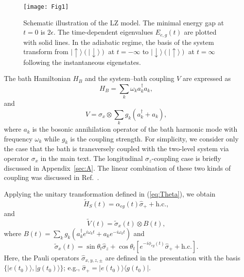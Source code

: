 \documentclass[english,nofootinbib, pra, twocolumn,superscriptaddress]{revtex4-1}
\begin{document}
\begin{figure}
\texttt{[image: Fig1]}\caption{Schematic illustration of the LZ model. The minimal energy gap at
$t=0$ is $2\epsilon$. The time-dependent eigenvalues $E_{e,g}(t)$
are plotted with solid lines. In the adiabatic regime, the basis of
the system transform from $\vert\uparrow\rangle(\vert\downarrow\rangle)$
at $t=-\infty$ to $\vert\downarrow\rangle(\vert\uparrow\rangle)$
at $t=\infty$ following the instantaneous eigenstates.}
\label{fig:LZ}
\end{figure}

The bath Hamiltonian $H_{B}$ and the system--bath coupling $V$ are expressed as
\begin{equation}
H_{B}=\sum_{k}\omega_{k}a_{k}^{\dagger}a_{k},\label{eq:HB}
\end{equation}
and
\begin{equation}
V=\sigma_{x}\otimes\sum_{k}g_{k}(a_{k}^{\dagger}+a_{k}),\label{eq:VLZ}
\end{equation}
where $a_{k}$ is the bosonic annihilation operator of the bath harmonic
mode with frequency $\omega_{k}$ while $g_{k}$ is the coupling
strength. For simplicity, we consider only the case that the bath is transversely
coupled with the two-level system via operator $\sigma_{x}$ in the main text. The longitudinal $\sigma_{z}$-coupling case is briefly discussed in Appendix~\ref{sec:A}. The linear combination of
these two kinds of coupling was discussed in Ref.~\citep{2015.Thorwart}. 

Applying the unitary transformation defined in (\ref{eq:Theta}),
we obtain
\begin{equation}
\tilde{H}_{S}(t)=\alpha_{eg}(t)\hat{\sigma}_{+}+\text{h.c.},\label{eq:HSLZ}
\end{equation}
and 
\begin{equation}
\tilde{V}(t)=\tilde{\sigma}_{x}(t)\otimes B(t),\label{eq:Vad}
\end{equation}
where $B(t)=\sum_{k}g_{k}(a_{k}^{\dagger}e^{i\omega_{k}t}+a_{k}e^{-i\omega_{k}t})$
and 
\begin{equation}
\tilde{\sigma}_{x}(t)=\sin\theta_{t}\hat{\sigma}_{z}+\cos\theta_{t}[e^{-i\phi_{eg}(t)}\hat{\sigma}_{+}+\text{h.c.}].\label{eq:Sxad}
\end{equation}
Here, the Pauli operators $\hat{\sigma}_{x,y,z,\pm}$ are defined in
the presentation with the basis $\{\vert e(t_{0})\rangle,\vert g(t_{0})\rangle\}$; e.g., $\hat{\sigma}_{+}=\vert e(t_{0})\rangle\langle g(t_{0})\vert$.
\end{document}
